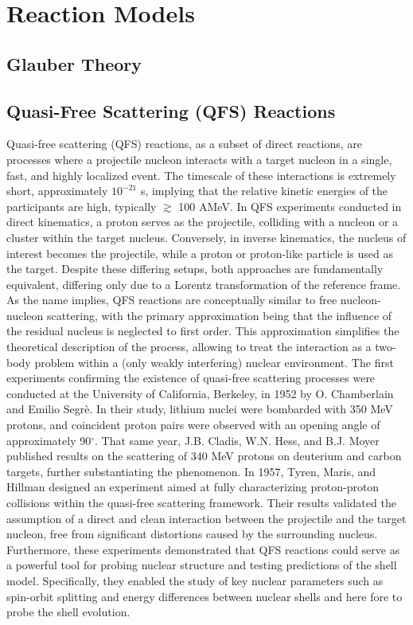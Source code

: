 \section{Reaction Models}
\subsection{Glauber Theory}
\subsection{Quasi-Free Scattering (QFS) Reactions}
Quasi-free scattering (QFS) reactions, as a subset of direct reactions, are processes where a projectile nucleon interacts with a target nucleon in a single, fast, and highly localized event. The timescale of these interactions is extremely short, approximately $10^{-21}$ s, implying that the relative kinetic energies of the participants are high, typically $\gtrsim$ 100 AMeV.\newline
In QFS experiments conducted in direct kinematics, a proton serves as the projectile, colliding with a nucleon or a cluster within the target nucleus. Conversely, in inverse kinematics, the nucleus of interest becomes the projectile, while a proton or proton-like particle is used as the target. Despite these differing setups, both approaches are fundamentally equivalent, differing only due to a Lorentz transformation of the reference frame.\newline
As the name implies, QFS reactions are conceptually similar to free nucleon-nucleon scattering, with the primary approximation being that the influence of the residual nucleus is neglected to first order. This approximation simplifies the theoretical description of the process, allowing to treat the interaction as a two-body problem within a (only weakly interfering) nuclear environment.\newline
The first experiments confirming the existence of quasi-free scattering processes were conducted at the University of California, Berkeley, in 1952 by O. Chamberlain and Emilio Segr\`e\cite{chamberlain1952proton}. In their study, lithium nuclei were bombarded with 350 MeV protons, and coincident proton pairs were observed with an opening angle of approximately 90$^{\circ}$. That same year, J.B. Cladis, W.N. Hess, and B.J. Moyer published results on the scattering of 340 MeV protons on deuterium and carbon targets\cite{cladis1952nucleon}, further substantiating the phenomenon.\newline
In 1957, Tyren, Maris, and Hillman designed an experiment aimed at fully characterizing proton-proton collisions within the quasi-free scattering framework\cite{MARIS19581}. Their results validated the assumption of a direct and clean interaction between the projectile and the target nucleon, free from significant distortions caused by the surrounding nucleus. Furthermore, these experiments demonstrated that QFS reactions could serve as a powerful tool for probing nuclear structure and testing predictions of the shell model. Specifically, they enabled the study of key nuclear parameters such as spin-orbit splitting and energy differences between nuclear shells and here fore to probe the shell evolution. \newline
